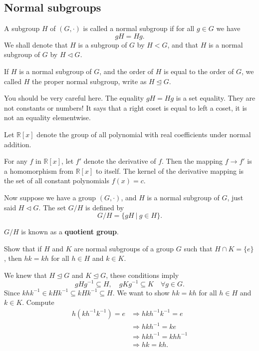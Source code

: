 \subsection{Normal subgroups}

\begin{definition}
    A subgroup $H$ of $(G, \cdot)$ is called a normal subgroup if for all $g \in G$ we have 
    \begin{equation}
        gH = Hg.
    \end{equation}
    We shall denote that $H$ is a subgroup of $G$ by $H < G$, and that $H$ is a normal subgroup of $G$ 
    by $H \vartriangleleft G$. 
    
    If $H$ is a normal subgroup of $G$, and the order of $H$ is equal to the order of $G$, we called $H$ the proper normal subgroup, write as $H \trianglelefteq G$. 
\end{definition}

You should be very careful here. The equality $gH = Hg$ is a set equality. They are not constants or numbers! It says that a 
right coset is equal to left a coset, it is not an equality elementwise.

\begin{example}
    Let $\mathbb{R}[x]$ denote the group of all polynomial with real coefficients under normal addition. 

    For any $f$ in $\mathbb{R}[x]$, let $f'$ denote the derivative of $f$. Then the mapping $f \to f'$ is a homomorphism from 
    $\mathbb{R}[x]$ to itself. The kernel of the derivative mapping is the set of all constant polynomials $f(x) = c$.
\end{example}

Now suppose we have a group $(G, \cdot)$, and $H$ is a normal subgroup of $G$, just said $H \vartriangleleft G$. The set $G/H$ is defined by 
\[
G/H = \{ gH \> | \> g \in H \}.
\]

$G/H$ is known as a \textbf{quotient group}.

\begin{example}
    Show that if $H$ and $K$ are normal subgroups of a group $G$ such that $H \cap K = \{ e \}$, then 
    $hk = kh$ for all $h \in H$ and $k \in K$.
\end{example}
\begin{solution}
    We knew that $H \unlhd G$ and $K \unlhd G$, these conditions imply
    \[
        gHg^{-1} \subseteq H,\quad gKg^{-1} \subseteq K \quad \forall g \in G.
    \]
    Since $khk^{-1} \in kHk^{-1} \subseteq kHk^{-1}\subseteq H$. 
    We want to show $hk = kh$ for all $h \in H$ and $k \in K$. Compute 
    \begin{align*}
        h(kh^{-1}k^{-1}) = e &\Rightarrow hkh^{-1}k^{-1} = e\\
        &\Rightarrow hkh^{-1} = ke\\
        &\Rightarrow hkh^{-1} = khh^{-1}\\
        &\Rightarrow hk = kh.
    \end{align*}
\end{solution}

